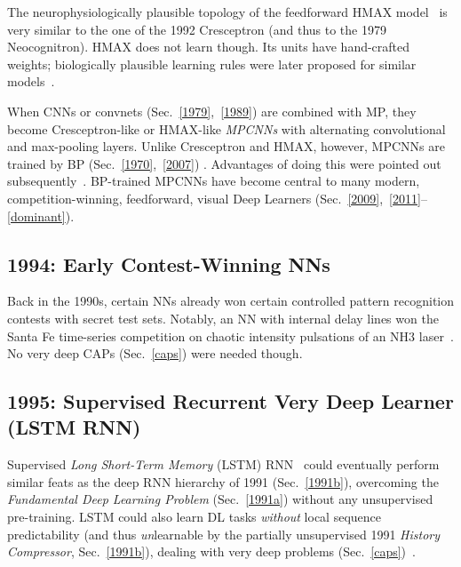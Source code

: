 \documentclass[letterpaper]{article}
\begin{document}
\begin{CJK*}{UTF8}{gbsn}
The neurophysiologically plausible topology of the feedforward HMAX model~\citep{riesenhuber:1999} 
is very similar to the one of the 1992 Cresceptron (and thus to the 1979 Neocognitron).
HMAX does not learn though. Its units have hand-crafted weights; 
biologically plausible learning rules were later proposed for
similar models~\citep[e.g.,][]{serre2002,teichmann2012}.


When CNNs or convnets (Sec.~\ref{1979},~\ref{1989}) 
are combined with MP, they become Cresceptron-like or HMAX-like {\em MPCNNs} with
alternating convolutional and max-pooling layers. 
Unlike Cresceptron and HMAX, however, MPCNNs are trained by 
BP (Sec.~\ref{1970},~\ref{2007}) \citep{ranzato-cvpr-07}.
Advantages of doing this
were pointed out subsequently~\citep{scherer:2010}.
BP-trained MPCNNs 
have become
central to many modern, competition-winning, feedforward, visual Deep Learners (Sec.~\ref{2009},~\ref{2011}--\ref{dominant}). 



\subsection{1994: Early Contest-Winning NNs}
\label{1994}

Back in the 1990s, certain NNs already won certain 
controlled pattern recognition contests 
with secret test sets. Notably, 
an NN with internal delay lines 
 won the Santa Fe time-series competition on chaotic intensity 
pulsations of an NH3 laser~\citep{wan1994,weigend1993}.
No very deep CAPs (Sec.~\ref{caps}) were needed though. 


\subsection{1995: Supervised Recurrent Very Deep Learner (LSTM RNN)}
\label{1997}

Supervised {\em Long Short-Term Memory} (LSTM) RNN~\citep{lstm97and95,Gers:2000nc,Perez:02} 
could eventually perform similar feats as  the deep RNN hierarchy of 1991
(Sec.~\ref{1991b}),
overcoming the {\em Fundamental Deep Learning Problem} (Sec.~\ref{1991a}) without any unsupervised pre-training.
LSTM could also learn DL tasks {\em without} local sequence predictability (and thus 
{\em un}learnable by the partially 
unsupervised 1991 {\em History Compressor}, Sec.~\ref{1991b}), dealing with  
very deep problems (Sec.~\ref{caps})~\citep[e.g.,][]{Gers:02jmlr}.


\end{CJK*}
\end{document}
